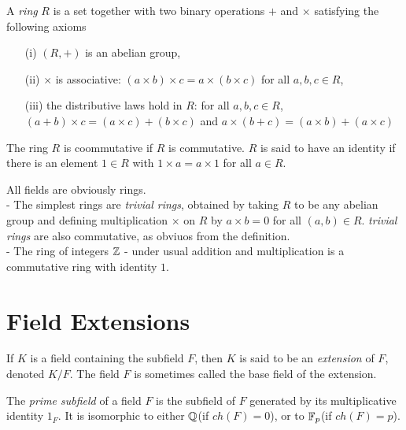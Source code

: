 \begin{definition}
  A \textit{ring} $R$ is a set together with two binary operations $+$ and $\times$ satisfying
  the following axioms

  \begin{itemize}
    \item[(i)]{
        $(R,+)$ is an abelian group,
      }
    \item[(ii)]{
        $\times$ is associative: $(a\times b)\times c=a\times(b\times c)$ for all $a,b,c\in R$,
      }
    \item[(iii)]{
        the distributive laws hold in $R$: for all $a,b,c\in R$,
        $(a+b)\times c=(a\times c)+(b\times c)$ and $a\times(b+c)=(a\times b)+(a\times c)$
      }
  \end{itemize}

  The ring $R$ is coommutative if $R$ is commutative. $R$ is said to have an identity if there
  is an element $1\in R$ with $1\times a=a\times 1$ for all $a\in R$. \cite{dummit}
\end{definition}

\begin{ex}
  All fields are obviously rings.\\
   - The simplest rings are \textit{trivial rings}, obtained by taking $R$ to be any abelian
  group and defining multiplication $\times$ on $R$ by $a\times b=0$ for all $(a,b)\in R$.
  \textit{trivial rings} are also commutative, as obviuos from the definition.\\
   - The ring of integers $\mathbb{Z}$ - under usual addition and multiplication is a commutative ring
  with identity $1$.
\end{ex}

\section{Field Extensions}

\begin{definition}
  If $K$ is a field containing the subfield $F$, then $K$ is said to be an \textit{extension} of
  $F$, denoted $K/F$. The field $F$ is sometimes called the base field of the extension.
  \cite{dummit}
\end{definition}

\begin{definition}
  The \textit{prime subfield} of a field $F$ is the subfield of $F$ generated by its
  multiplicative identity $1_F$. It is isomorphic to either $\mathbb{Q}$(if $ch(F)=0$), or to
  $\mathbb{F}_p$(if $ch(F)=p$).
\end{definition}

